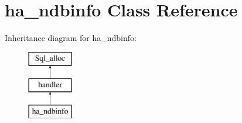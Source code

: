 \hypertarget{classha__ndbinfo}{}\section{ha\+\_\+ndbinfo Class Reference}
\label{classha__ndbinfo}
Inheritance diagram for ha\+\_\+ndbinfo\+:\begin{figure}[H]
\begin{center}
\leavevmode
\includegraphics[height=3.000000cm]{classha__ndbinfo}
\end{center}
\end{figure}
